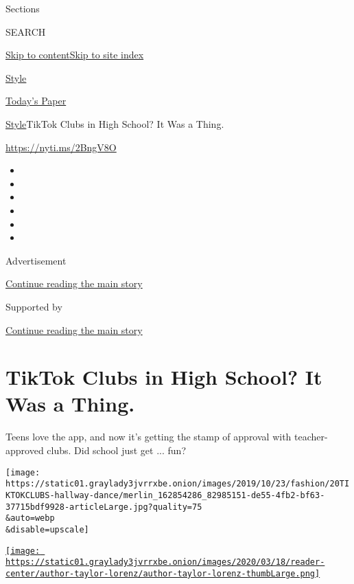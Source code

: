 Sections

SEARCH

\protect\hyperlink{site-content}{Skip to
content}\protect\hyperlink{site-index}{Skip to site index}

\href{https://www.nytimes3xbfgragh.onion/section/style}{Style}

\href{https://myaccount.nytimes3xbfgragh.onion/auth/login?response_type=cookie\&client_id=vi}{}

\href{https://www.nytimes3xbfgragh.onion/section/todayspaper}{Today's
Paper}

\href{/section/style}{Style}\textbar{}TikTok Clubs in High School? It
Was a Thing.

\href{https://nyti.ms/2BngV8O}{https://nyti.ms/2BngV8O}

\begin{itemize}
\item
\item
\item
\item
\item
\item
\end{itemize}

Advertisement

\protect\hyperlink{after-top}{Continue reading the main story}

Supported by

\protect\hyperlink{after-sponsor}{Continue reading the main story}

\hypertarget{tiktok-clubs-in-high-school-it-was-a-thing}{%
\section{TikTok Clubs in High School? It Was a
Thing.}\label{tiktok-clubs-in-high-school-it-was-a-thing}}

Teens love the app, and now it's getting the stamp of approval with
teacher-approved clubs. Did school just get ... fun?

\texttt{[image: https://static01.graylady3jvrrxbe.onion/images/2019/10/23/fashion/20TIKTOKCLUBS-hallway-dance/merlin\_162854286\_82985151-de55-4fb2-bf63-37715bdf9928-articleLarge.jpg?quality=75\\\&auto=webp\\\&disable=upscale]}

\href{https://www.nytimes3xbfgragh.onion/by/taylor-lorenz}{\texttt{[image: https://static01.graylady3jvrrxbe.onion/images/2020/03/18/reader-center/author-taylor-lorenz/author-taylor-lorenz-thumbLarge.png]}}

